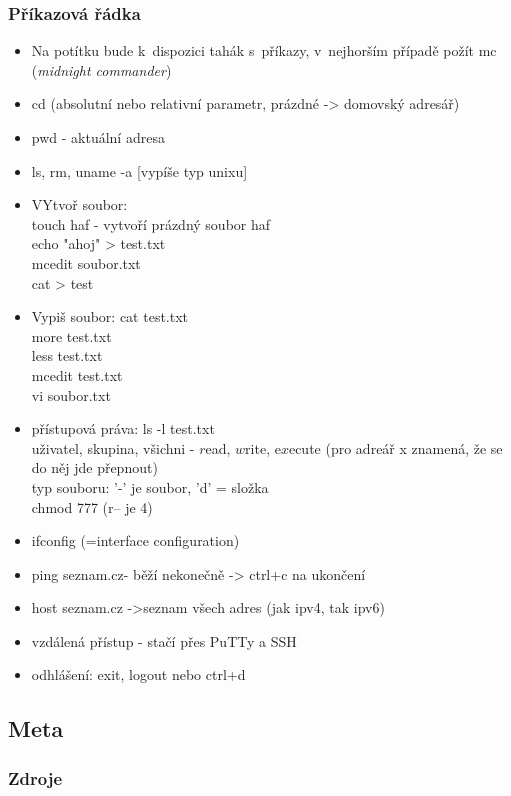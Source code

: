 \documentclass[12pt]{article}
\begin{document}
\subsubsection{Příkazová řádka}
\begin{itemize}
\item Na potítku bude k~dispozici tahák s~příkazy, v~nejhorším případě požít mc (\emph{midnight commander})
\item cd (absolutní nebo relativní parametr, prázdné -> domovský adresář)
\item pwd - aktuální adresa
\item ls, rm, uname -a [vypíše typ unixu]
\item VYtvoř soubor:\\
 touch  haf - vytvoří prázdný soubor haf\\
 echo "ahoj" > test.txt\\
 mcedit soubor.txt\\
 cat > test\\
\item Vypiš soubor:
cat test.txt\\
more test.txt\\
less test.txt\\
mcedit test.txt\\
 vi soubor.txt
\item přístupová práva: ls -l test.txt\\
uživatel, skupina, všichni - $r$ead, $w$rite, e$x$ecute (pro adreář x znamená, že se do něj jde přepnout)\\
typ souboru: '-' je soubor, 'd' = složka\\
chmod 777 (r-- je 4)\\
\item ifconfig (=interface configuration)
\item ping seznam.cz- běží nekonečně -> ctrl+c na ukončení
\item host seznam.cz ->seznam všech adres (jak ipv4, tak ipv6)

\item vzdálená přístup - stačí přes PuTTy a SSH
\item odhlášení: exit, logout nebo ctrl+d


\end{itemize}
\subsection{Meta}
\subsubsection{Zdroje}
\end{document}
